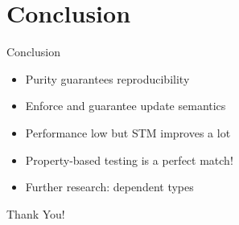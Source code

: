 \documentclass{beamer}
\begin{document}
\section{Conclusion}

\begin{frame}{Conclusion}
  \begin{itemize}
    \item Purity guarantees reproducibility 
    \item Enforce and guarantee update semantics 
    \item Performance low but STM improves a lot
    \item Property-based testing is a perfect match!
    \item Further research: dependent types
  \end{itemize}
\end{frame}

\begin{frame}{}
  \begin{center}
  Thank You!
  \end{center}
\end{frame}
\end{document}
